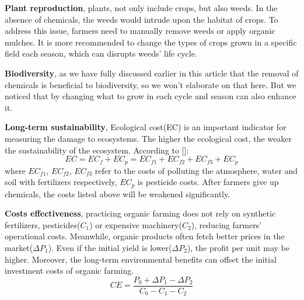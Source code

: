 \documentclass[12pt]{article}
\begin{document}
	\textbf{Plant reproduction}, plants, not only include crops, but also weeds. In the absence of chemicals, the weeds would intrude upon the habitat of crops. To address this issue, farmers need to manually remove weeds or apply organic mulches. It is more recommended to change the types of crops grown in a specific field each season, which can disrupts weeds’ life cycle.
	
	\textbf{Biodiversity}, as we have fully discussed earlier in this article that the removal of chemicals is beneficial to biodiversity, so we won’t elaborate on that here. But we noticed that by changing what to grow in each cycle and season can also enhance it.
	
	\textbf{Long-term sustainability}, Ecological cost(EC) is an important indicator for measuring the damage to ecosystems. The higher the ecological cost, the weaker the sustainability of the ecosystem. According to []:
	\begin{equation}
		EC=EC_f+EC_p=EC_{f1}+EC_{f2}+EC_{f3}+EC_p
	\end{equation}
	where $EC_{f1}$, $EC_{f2}$, $EC_{f3}$ refer to the costs of polluting the atmosphere, water and soil with fertilizers respectively, $EC_p$ is pesticide costs. After farmers give up chemicals, the costs listed above will be weakened significantly.
	
	\textbf{Costs effectiveness}, practicing organic farming does not rely on synthetic fertilizers, pesticides($C_1$) or expensive machinery($C_2$), reducing farmers' operational costs. Meanwhile, organic products often fetch better prices in the market($\Delta P_1$). Even if the initial yield is lower($\Delta P_2$), the profit per unit may be higher. Moreover, the long-term environmental benefits can offset the initial investment costs of organic farming.
	\begin{equation}
		CE=\frac{P_0+\Delta P_1-\Delta P_2}{C_0-C_1-C_2}
	\end{equation}
	
	
	
	
	
	
	
	
	
	
	
	
	
	
	
\end{document}
